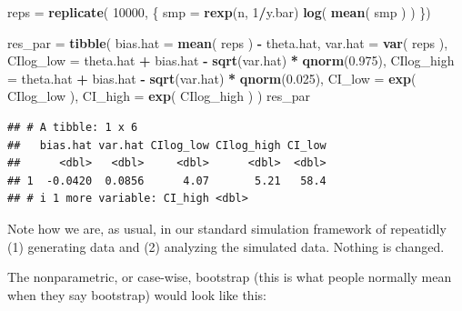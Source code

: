 \documentclass[
]{book}
\newenvironment{Shaded}{\begin{snugshade}}{\end{snugshade}}
\newcommand{\AttributeTok}[1]{\textcolor[rgb]{0.13,0.29,0.53}{#1}}
\newcommand{\DecValTok}[1]{\textcolor[rgb]{0.00,0.00,0.81}{#1}}
\newcommand{\FloatTok}[1]{\textcolor[rgb]{0.00,0.00,0.81}{#1}}
\newcommand{\FunctionTok}[1]{\textcolor[rgb]{0.13,0.29,0.53}{\textbf{#1}}}
\newcommand{\NormalTok}[1]{#1}
\newcommand{\OtherTok}[1]{\textcolor[rgb]{0.56,0.35,0.01}{#1}}
\newcommand{\SpecialCharTok}[1]{\textcolor[rgb]{0.81,0.36,0.00}{\textbf{#1}}}
\begin{document}
\begin{Shaded}
\begin{Highlighting}[]
\NormalTok{reps }\OtherTok{=} \FunctionTok{replicate}\NormalTok{( }\DecValTok{10000}\NormalTok{, \{}
\NormalTok{    smp }\OtherTok{=} \FunctionTok{rexp}\NormalTok{(n, }\DecValTok{1}\SpecialCharTok{/}\NormalTok{y.bar)}
    \FunctionTok{log}\NormalTok{( }\FunctionTok{mean}\NormalTok{( smp ) )}
\NormalTok{\})}

\NormalTok{res\_par }\OtherTok{=} \FunctionTok{tibble}\NormalTok{( }
  \AttributeTok{bias.hat =} \FunctionTok{mean}\NormalTok{( reps ) }\SpecialCharTok{{-}}\NormalTok{ theta.hat,}
  \AttributeTok{var.hat =} \FunctionTok{var}\NormalTok{( reps ),}
  \AttributeTok{CIlog\_low =}\NormalTok{ theta.hat }\SpecialCharTok{+}\NormalTok{ bias.hat }\SpecialCharTok{{-}} \FunctionTok{sqrt}\NormalTok{(var.hat) }\SpecialCharTok{*} \FunctionTok{qnorm}\NormalTok{(}\FloatTok{0.975}\NormalTok{),}
  \AttributeTok{CIlog\_high =}\NormalTok{ theta.hat }\SpecialCharTok{+}\NormalTok{ bias.hat }\SpecialCharTok{{-}} \FunctionTok{sqrt}\NormalTok{(var.hat) }\SpecialCharTok{*} \FunctionTok{qnorm}\NormalTok{(}\FloatTok{0.025}\NormalTok{),}
  \AttributeTok{CI\_low =} \FunctionTok{exp}\NormalTok{( CIlog\_low ),}
  \AttributeTok{CI\_high =} \FunctionTok{exp}\NormalTok{( CIlog\_high ) )}
\NormalTok{res\_par}
\end{Highlighting}
\end{Shaded}

\begin{verbatim}
## # A tibble: 1 x 6
##   bias.hat var.hat CIlog_low CIlog_high CI_low
##      <dbl>   <dbl>     <dbl>      <dbl>  <dbl>
## 1  -0.0420  0.0856      4.07       5.21   58.4
## # i 1 more variable: CI_high <dbl>
\end{verbatim}

Note how we are, as usual, in our standard simulation framework of repeatidly (1) generating data and (2) analyzing the simulated data.
Nothing is changed.

The nonparametric, or case-wise, bootstrap (this is what people normally mean when they say bootstrap) would look like this:
\end{document}
